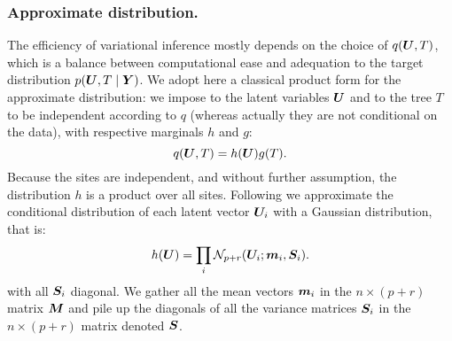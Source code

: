 \subsubsection*{Approximate distribution.}
The efficiency of variational inference mostly depends on the choice of $q({\boldsymbol{U}}, T)$, which is a balance between computational ease and adequation to the target distribution $p({\boldsymbol{U}}, T \mid {\boldsymbol{Y}})$. We adopt here a classical product form for the approximate distribution: we impose to the latent variables ${\boldsymbol{U}}$ and to the tree $T$ to be independent according to $q$ (whereas actually they are not conditional on the data), with respective marginals $h$ and $g$:
$$
q({\boldsymbol{U}}, T) =  h({\boldsymbol{U}})g(T).
$$
Because the sites are independent, and without further assumption, the distribution $h$ is a product over all sites. Following \cite{CMR18} we approximate the conditional distribution of each latent vector ${\boldsymbol{U}}_i$ with a Gaussian distribution, that is:
$$
h({\boldsymbol{U}}) = \prod_i {\mathcal{N}}_{p+r}({\boldsymbol{U}}_i; {\boldsymbol{m}}_i, {\boldsymbol{S}}_i).
$$
with all ${\boldsymbol{S}}_i$ diagonal. We gather all the mean vectors ${\boldsymbol{m}}_i$ in the $n \times (p+r)$ matrix ${\boldsymbol{M}}$ and pile up the diagonals of all the variance matrices ${\boldsymbol{S}}_i$ in the $n \times (p+r)$ matrix denoted ${\boldsymbol{S}}$.


